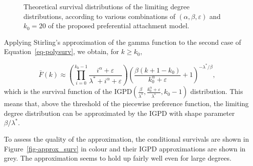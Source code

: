 \documentclass[
  sn-basic,
]{sn-jnl}
\theoremstyle{plain}
\theoremstyle{remark}
\begin{document}
\begin{figure}[H]


\caption{\label{fig-polylinsurv}Theoretical survival distributions of
the limiting degree distributions, according to various combinations of
\((\alpha, \beta, \varepsilon)\) and \(k_0=20\) of the proposed
preferential attachment model.}

\end{figure}%

Applying Stirling's approximation of the gamma function to the second
case of Equation~\ref{eq-polysurv}, we obtain, for \(k\geq k_0\),

\[
\bar F(k) 
\displaystyle\approx \left(\prod_{i=0}^{k_0-1}\frac{i^\alpha + \varepsilon}{\lambda^*+i^\alpha + \varepsilon}\right) \left(\frac{\beta(k+1-k_0)}{k_0^{\alpha}+\varepsilon} + 1\right)^{-\lambda^*/\beta},%
\] which is the survival function of the
\(\text{IGPD}\displaystyle\left(\frac{\beta}{\lambda^*}, \frac{k_0^\alpha + \varepsilon}{\lambda^*},k_0-1\right)\)
distribution. This means that, above the threshold of the piecewise
preference function, the limiting degree distribution can be
approximated by the IGPD with shape parameter \(\beta/\lambda^{*}\).

To assess the quality of the approximation, the conditional survivals
are shown in Figure~\ref{fig-approx_surv} in colour and their IGPD
approximations are shown in grey. The approximation seems to hold up
fairly well even for large degrees.
\end{document}
